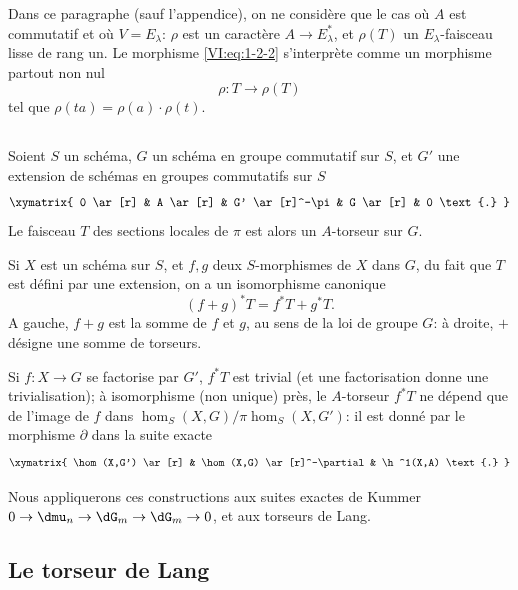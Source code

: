 Dans ce paragraphe (sauf l'appendice), on ne considère que le cas où $A$ 
est commutatif et où $V=E_\lambda$: $\rho$ est un caractère 
$A\to E_\lambda^\ast$, et $\rho(T)$ un $E_\lambda$-faisceau lisse de rang 
un. Le morphisme \eqref{VI:eq:1-2-2} s'interprète comme un morphisme partout 
non nul 
\begin{equation*}\tag{1.2.3}\label{VI:eq:1-2-3}
  \rho:T\to \rho(T) 
\end{equation*}
tel que $\rho(t a) = \rho(a)\cdot\rho(t)$. 





\subsection{}\label{VI:1-3}

Soient $S$ un schéma, $G$ un schéma en groupe commutatif sur $S$, et $G'$ 
une extension de schémas en groupes commutatifs sur $S$
\[\xymatrix{
  0 \ar[r] 
    & A \ar[r] 
    & G' \ar[r]^-\pi 
    & G \ar[r] 
    & 0 \text{.}
}\]
Le faisceau $T$ des sections locales de $\pi$ est alors un $A$-torseur sur 
$G$. 

Si $X$ est un schéma sur $S$, et $f,g$ deux $S$-morphismes de $X$ dans $G$, 
du fait que $T$ est défini par une extension, on a un isomorphisme 
canonique 
\begin{equation*}\tag{1.3.1}\label{VI:eq:1-3-1}
  (f+g)^\ast T = f^\ast T + g^\ast T \text{.}
\end{equation*}
A gauche, $f+g$ est la somme de $f$ et $g$, au sens de la loi de groupe $G$: 
à droite, $+$ désigne une somme de torseurs. 

Si $f:X\to G$ se factorise par $G'$, $f^\ast T$ est trivial (et une 
factorisation donne une trivialisation); à isomorphisme (non unique) près, 
le $A$-torseur $f^\ast T$ ne dépend que de l'image de $f$ dans 
$\hom_S(X,G)/\pi\hom_S(X,G')$: il est donné par le morphisme $\partial$ dans 
la suite exacte 
\[\xymatrix{
  \hom(X,G') \ar[r] 
    & \hom(X,G) \ar[r]^-\partial 
    & \h^1(X,A) \text{.}
}\]

Nous appliquerons ces constructions aux suites exactes de Kummer 
$0 \to \dmu_n \to \dG_m \to \dG_m \to 0$, et aux torseurs de Lang. 





\subsection{Le torseur de Lang}\label{VI:1-4}

